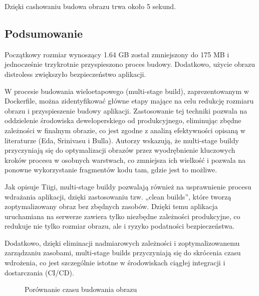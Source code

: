 \documentclass{article}
\begin{document}
Dzięki cashowaniu budowa obrazu trwa około 5 sekund.

\newpage

\subsection{Podsumowanie}

Początkowy rozmiar wynoszący 1.64 GB został zmniejszony do 175 MB i jednocześnie trzykrotnie przyspieszono proces budowy. Dodatkowo, użycie obrazu distroless zwiększyło bezpieczeństwo aplikacji.

W procesie budowania wieloetapowego (multi-stage build), zaprezentowanym w Dockerfile, można zidentyfikować główne etapy mające na celu redukcję rozmiaru obrazu i przyspieszenie budowy aplikacji. Zastosowanie tej techniki pozwala na oddzielenie środowiska deweloperskiego od produkcyjnego, eliminując zbędne zależności w finalnym obrazie, co jest zgodne z analizą efektywności opisaną w literaturze (Eda, Srinivasu i Bulla)\cite{efficientDocker}. Autorzy wskazują, że multi-stage buildy przyczyniają się do optymalizacji obrazów przez wyodrębnienie kluczowych kroków procesu w osobnych warstwach, co zmniejsza ich wielkość i pozwala na ponowne wykorzystanie fragmentów kodu tam, gdzie jest to możliwe.

Jak opisuje Tiigi\cite{smallerContainers}, multi-stage buildy pozwalają również na usprawnienie procesu wdrażania aplikacji, dzięki zastosowaniu tzw. „clean builds”, które tworzą zoptymalizowany obraz bez zbędnych zasobów. Dzięki temu aplikacja uruchamiana na serwerze zawiera tylko niezbędne zależności produkcyjne, co redukuje nie tylko rozmiar obrazu, ale i ryzyko podatności bezpieczeństwa.

Dodatkowo, dzięki eliminacji nadmiarowych zależności i zoptymalizowanemu zarządzaniu zasobami, multi-stage builds przyczyniają się do skrócenia czasu wdrożenia, co jest szczególnie istotne w środowiskach ciągłej integracji i dostarczania (CI/CD)\cite{reduceDockerImages}.

\begin{figure}[H]
\centering
{}
\caption{Porównanie czasu budowania obrazu}
\label{fig:czas}
\end{figure}
\end{document}
